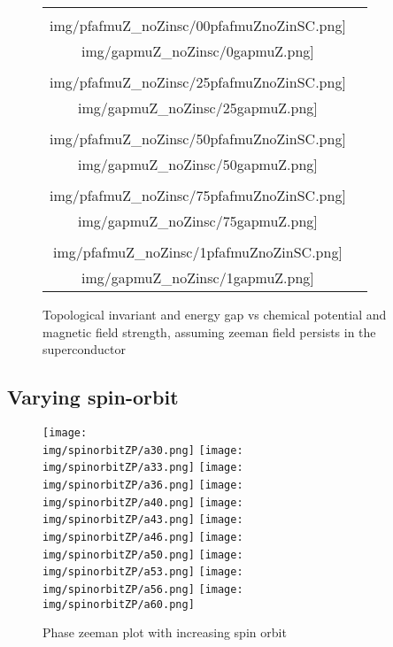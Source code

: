 \documentclass[10pt,a4paper]{article}
\newcommand{\img}{./images}
\begin{document}
	
%				
\begin{figure}
	\begin{tabular}{cc}
				\texttt{[image: \\img/pfafmuZ\_noZinsc/00pfafmuZnoZinSC.png]}&
			\texttt{[image: \\img/gapmuZ\_noZinsc/0gapmuZ.png]}\\
				\texttt{[image: \\img/pfafmuZ\_noZinsc/25pfafmuZnoZinSC.png]}&
			\texttt{[image: \\img/gapmuZ\_noZinsc/25gapmuZ.png]}\\
				\texttt{[image: \\img/pfafmuZ\_noZinsc/50pfafmuZnoZinSC.png]}&
			\texttt{[image: \\img/gapmuZ\_noZinsc/50gapmuZ.png]}\\
				\texttt{[image: \\img/pfafmuZ\_noZinsc/75pfafmuZnoZinSC.png]}&
			\texttt{[image: \\img/gapmuZ\_noZinsc/75gapmuZ.png]}\\
				\texttt{[image: \\img/pfafmuZ\_noZinsc/1pfafmuZnoZinSC.png]}&
			\texttt{[image: \\img/gapmuZ\_noZinsc/1gapmuZ.png]}\\
	\end{tabular}\label{fig:muZnosc}
		\caption{Topological invariant and energy gap vs chemical potential and magnetic field strength, assuming zeeman field persists in the superconductor}
\end{figure}

	\subsection{Varying spin-orbit}
		\begin{figure}[H]
			\texttt{[image: \\img/spinorbitZP/a30.png]}
			\texttt{[image: \\img/spinorbitZP/a33.png]}
			\texttt{[image: \\img/spinorbitZP/a36.png]}
			\texttt{[image: \\img/spinorbitZP/a40.png]}
			\texttt{[image: \\img/spinorbitZP/a43.png]}
			\texttt{[image: \\img/spinorbitZP/a46.png]}
			\texttt{[image: \\img/spinorbitZP/a50.png]}
			\texttt{[image: \\img/spinorbitZP/a53.png]}
			\texttt{[image: \\img/spinorbitZP/a56.png]}
			\texttt{[image: \\img/spinorbitZP/a60.png]}
			\caption{Phase zeeman plot with increasing spin orbit}
		\end{figure}
\end{document}

